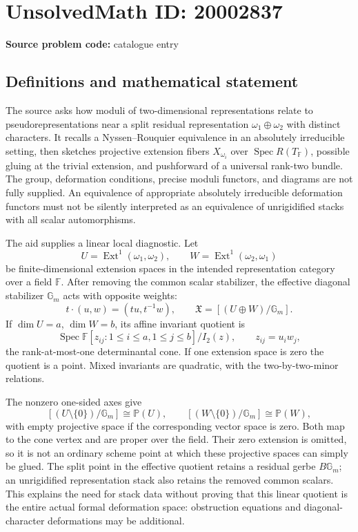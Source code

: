 \documentclass[11pt]{article}
\newcommand{\PP}{\mathbb{P}}
\begin{document}
\section*{UnsolvedMath ID: 20002837}
\textbf{Source problem code:} catalogue entry
\subsection{Definitions and mathematical statement}
The source asks how moduli of two-dimensional representations relate to pseudorepresentations near a split residual representation $\omega_1\oplus\omega_2$ with distinct characters. It recalls a Nyssen--Rouquier equivalence in an absolutely irreducible setting, then sketches projective extension fibers $X_{\omega_i}$ over $\operatorname{Spec}R(T_{\mathbb F})$, possible gluing at the trivial extension, and pushforward of a universal rank-two bundle. The group, deformation conditions, precise moduli functors, and diagrams are not fully supplied. An equivalence of appropriate absolutely irreducible deformation functors must not be silently interpreted as an equivalence of unrigidified stacks with all scalar automorphisms.

The aid supplies a linear local diagnostic. Let
\[
 U=\operatorname{Ext}^1(\omega_1,\omega_2),\qquad
 W=\operatorname{Ext}^1(\omega_2,\omega_1)
\]
be finite-dimensional extension spaces in the intended representation category over a field $\mathbb F$. After removing the common scalar stabilizer, the effective diagonal stabilizer $\mathbb G_m$ acts with opposite weights:
\[
 t\cdot(u,w)=(tu,t^{-1}w),\qquad
 \mathfrak X=[(U\oplus W)/\mathbb G_m].
\]
If $\dim U=a$, $\dim W=b$, its affine invariant quotient is
\[
 \operatorname{Spec}\mathbb F[z_{ij}:1\le i\le a,1\le j\le b]/I_2(z),
 \qquad z_{ij}=u_iw_j,
\]
the rank-at-most-one determinantal cone. If one extension space is zero the quotient is a point. Mixed invariants are quadratic, with the two-by-two-minor relations.

The nonzero one-sided axes give
\[
 [(U\setminus\{0\})/\mathbb G_m]\cong\PP(U),\qquad
 [(W\setminus\{0\})/\mathbb G_m]\cong\PP(W),
\]
with empty projective space if the corresponding vector space is zero. Both map to the cone vertex and are proper over the field. Their zero extension is omitted, so it is not an ordinary scheme point at which these projective spaces can simply be glued. The split point in the effective quotient retains a residual gerbe $B\mathbb G_m$; an unrigidified representation stack also retains the removed common scalars. This explains the need for stack data without proving that this linear quotient is the entire actual formal deformation space: obstruction equations and diagonal-character deformations may be additional.
\end{document}

